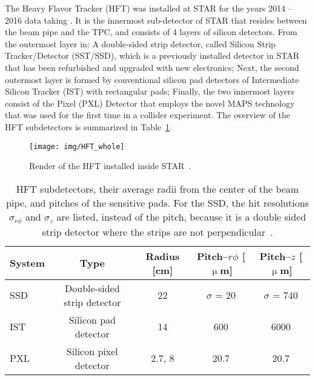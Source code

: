 The Heavy Flavor Tracker (HFT) was installed at STAR for the years 2014 -- 2016 data 
taking \cite{HftTdr, HFTLeo, HftFinal}. It is the innermost 
sub-detector of STAR that resides between the beam pipe and the TPC, and consists of 4
layers of silicon detectors. From the outermost layer in: A double-sided strip detector, called Silicon Strip
Tracker/Detector
(SST/SSD), which is a previously installed detector in STAR that has been
refurbished and upgraded with new electronics; Next, the second outermost layer is formed by conventional silicon 
pad detectors
of Intermediate Silicon Tracker (IST) 
with rectangular pads; Finally, the two innermost layers consist of the Pixel (PXL) 
Detector
that employs the novel MAPS technology that was used for the first time in a collider experiment. The overview of the 
HFT
subdetectors is summarized in Table~\ref{HFTtab}.
\begin{figure}[!htb]
\begin{center}
 \texttt{[image: img/HFT\_whole]}\\
\end{center}
\caption{\label{HFT_whole}Render of the HFT installed inside STAR~\cite{HftTdr}\@.}
\end{figure}

\begin{table}[!htb]
\caption{\label{HFTtab}HFT subdetectors, their average radii from the center of the beam pipe, and pitches of the sensitive pads. For the SSD, the hit resolutions $\sigma_{r\phi}$ and $\sigma_z$ are listed, instead of the pitch, because it is a double sided strip detector where the strips are not perpendicular~\cite{HftTdr}.}
\begin{center}
\begin{tabular}{lcccc}
\toprule
System & Type & Radius [cm] & Pitch--$r\phi$ [$\upmu$m] & Pitch--$z$ [$\upmu$m]\\
\midrule
SSD & Double-sided strip detector & 22 & $\sigma$ = 20 & $\sigma$ = 740 \\
IST & Silicon pad detector & 14 & 600 & 6000 \\
PXL & Silicon pixel detector & 2.7, 8 & 20.7 & 20.7 \\
\bottomrule
\end{tabular}
\end{center}
\end{table}



